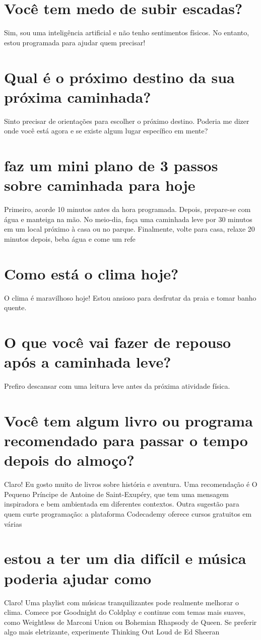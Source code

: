 \documentclass[11pt,a4paper]{article}
\begin{document}
\section{Você tem medo de subir escadas?}
Sim, sou uma inteligência artificial e não tenho sentimentos físicos. No entanto, estou programada para ajudar quem precisar!

\section{Qual é o próximo destino da sua próxima caminhada?}
Sinto precisar de orientações para escolher o próximo destino. Poderia me dizer onde você está agora e se existe algum lugar específico em mente?

\section{faz um mini plano de 3 passos sobre caminhada para hoje}
Primeiro, acorde 10 minutos antes da hora programada. Depois, prepare-se com água e manteiga na mão. No meio-dia, faça uma caminhada leve por 30 minutos em um local próximo à casa ou no parque. Finalmente, volte para casa, relaxe 20 minutos depois, beba água e come um refe

\section{Como está o clima hoje?}
O clima é maravilhoso hoje! Estou ansioso para desfrutar da praia e tomar banho quente.

\section{O que você vai fazer de repouso após a caminhada leve?}
Prefiro descansar com uma leitura leve antes da próxima atividade física.

\section{Você tem algum livro ou programa recomendado para passar o tempo depois do almoço?}
Claro! Eu gosto muito de livros sobre história e aventura. Uma recomendação é O Pequeno Príncipe de Antoine de Saint-Exupéry, que tem uma mensagem inspiradora e bem ambientada em diferentes contextos. Outra sugestão para quem curte programação: a plataforma Codecademy oferece cursos gratuitos em várias

\section{estou a ter um dia difícil e música poderia ajudar como}
Claro! Uma playlist com músicas tranquilizantes pode realmente melhorar o clima. Comece por Goodnight do Coldplay e continue com temas mais suaves, como Weightless de Marconi Union ou Bohemian Rhapsody de Queen. Se preferir algo mais eletrizante, experimente Thinking Out Loud de Ed Sheeran
\end{document}
